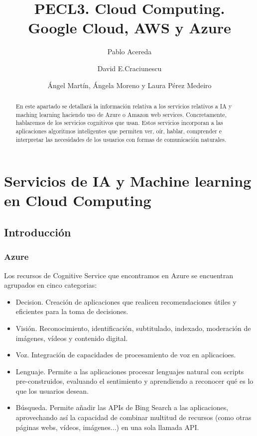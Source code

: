 \documentclass[runningheads]{llncs}
\begin{document}
\title{PECL3. Cloud Computing.\\ Google Cloud, AWS y Azure}

\author{Pablo Acereda \and  David E.Craciunescu \and Ángel Martín,  Ángela Moreno y Laura Pérez Medeiro}

%
\maketitle              
\section{Servicios de IA y Machine learning en Cloud Computing}
\begin{abstract}
    En este apartado se detallará la información relativa a los servicios relativos a IA y maching learning haciendo uso de Azure o Amazon web services. Concretamente, hablaremos de los servicios cognitivos que usan. Estos servicios incorporan a las aplicaciones algoritmos inteligentes que permiten ver, oír, hablar, comprender e interpretar las necesidades de los usuarios con formas de comunicación naturales.
\end{abstract}

\subsection{Introducción}
    \subsubsection{Azure}
    Los recursos de Cognitive Service que encontramos en Azure se encuentran agrupados en cinco categorias: 
    \begin{itemize}
        \item Decision. Creación de aplicaciones que realicen recomendaciones útiles y eficientes para la toma de decisiones.
        \item Visión. Reconocimiento, identificación, subtitulado, indexado, moderación de imágenes, vídeos y contenido digital.
        \item Voz. Integración de capacidades de procesamiento de voz en aplicacioes.
        \item Lenguaje. Permite a las aplicaciones procesar lenguajes natural con scripts pre-construidos, evaluando el sentimiento y aprendiendo a reconocer qué es lo que los usuarios desean.
        \item Búsqueda. Permite añadir las APIs de Bing Search a las aplicaciones, aprovechando así la capacidad de combinar multitud de recursos (como otras páginas webs, vídeos, imágenes...) en una sola llamada API.
    \end{itemize}
\end{document}
